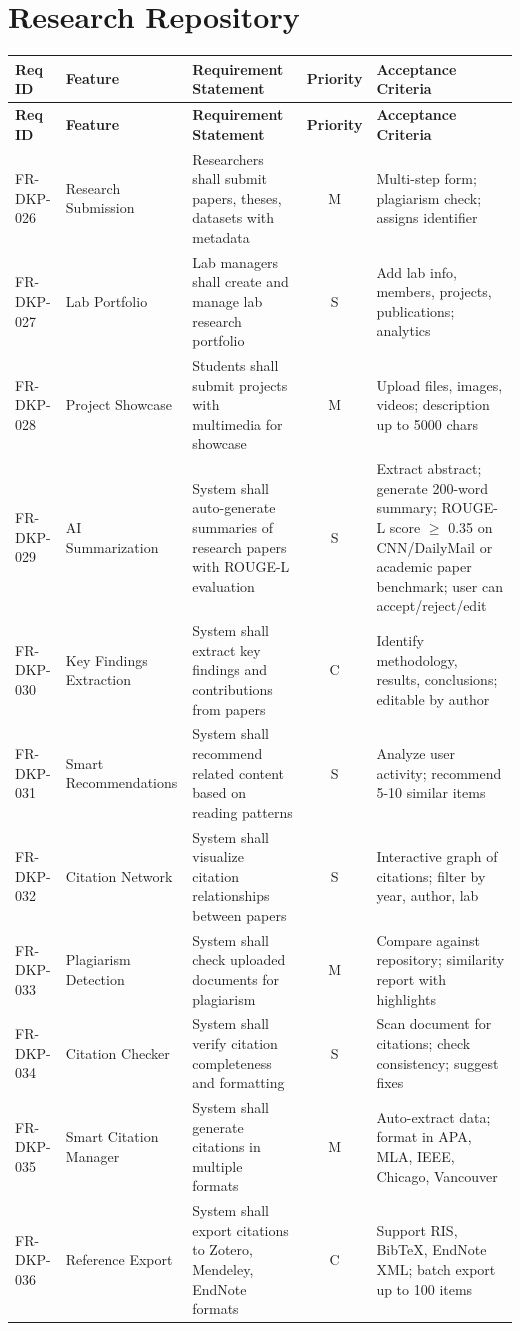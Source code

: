 \documentclass[12pt,a4paper]{report}
\begin{document}
\section{Research Repository}
\begin{longtable}{|p{2cm}|p{3cm}|p{5cm}|c|p{3cm}|}
\hline
\textbf{Req ID} & \textbf{Feature} & \textbf{Requirement Statement} & \textbf{Priority} & \textbf{Acceptance Criteria} \\ \hline
\endfirsthead
\hline
\textbf{Req ID} & \textbf{Feature} & \textbf{Requirement Statement} & \textbf{Priority} & \textbf{Acceptance Criteria} \\ \hline
\endhead
FR-DKP-026 & Research Submission & Researchers shall submit papers, theses, datasets with metadata & M & Multi-step form; plagiarism check; assigns identifier \\ \hline
FR-DKP-027 & Lab Portfolio & Lab managers shall create and manage lab research portfolio & S & Add lab info, members, projects, publications; analytics \\ \hline
FR-DKP-028 & Project Showcase & Students shall submit projects with multimedia for showcase & M & Upload files, images, videos; description up to 5000 chars \\ \hline
FR-DKP-029 & AI Summarization & System shall auto-generate summaries of research papers with ROUGE-L evaluation & S & Extract abstract; generate 200-word summary; ROUGE-L score $\geq$ 0.35 on CNN/DailyMail or academic paper benchmark; user can accept/reject/edit \\ \hline
FR-DKP-030 & Key Findings Extraction & System shall extract key findings and contributions from papers & C & Identify methodology, results, conclusions; editable by author \\ \hline
FR-DKP-031 & Smart Recommendations & System shall recommend related content based on reading patterns & S & Analyze user activity; recommend 5-10 similar items \\ \hline
FR-DKP-032 & Citation Network & System shall visualize citation relationships between papers & S & Interactive graph of citations; filter by year, author, lab \\ \hline
FR-DKP-033 & Plagiarism Detection & System shall check uploaded documents for plagiarism & M & Compare against repository; similarity report with highlights \\ \hline
FR-DKP-034 & Citation Checker & System shall verify citation completeness and formatting & S & Scan document for citations; check consistency; suggest fixes \\ \hline
FR-DKP-035 & Smart Citation Manager & System shall generate citations in multiple formats & M & Auto-extract data; format in APA, MLA, IEEE, Chicago, Vancouver \\ \hline
FR-DKP-036 & Reference Export & System shall export citations to Zotero, Mendeley, EndNote formats & C & Support RIS, BibTeX, EndNote XML; batch export up to 100 items \\ \hline
\end{longtable}
\end{document}
